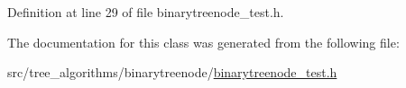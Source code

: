 Definition at line 29 of file binarytreenode\+\_\+test.\+h.



The documentation for this class was generated from the following file\+:\begin{DoxyCompactItemize}
\item 
src/tree\+\_\+algorithms/binarytreenode/\hyperlink{binarytreenode__test_8h}{binarytreenode\+\_\+test.\+h}\end{DoxyCompactItemize}
